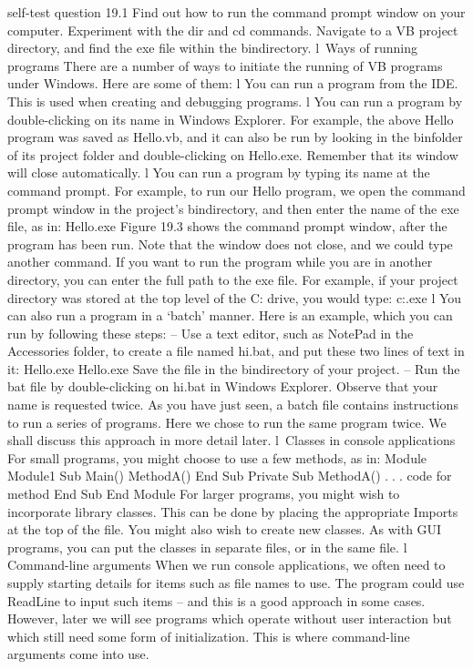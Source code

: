 self-test question
19.1	Find out how to run the command prompt window on your computer. Experiment with the dir and cd commands. Navigate to a VB project directory, and ﬁnd the exe ﬁle within the bin\Debug directory.
l Ways of running programs
There are a number of ways to initiate the running of VB programs under Windows. Here are some of them:
l	You can run a program from the IDE. This is used when creating and debugging programs.
l	You can run a program by double-clicking on its name in Windows Explorer. For example, the above Hello program was saved as Hello.vb, and it can also be run by looking in the bin\Debug folder of its project folder and double-clicking on Hello.exe. Remember that its window will close automatically.
l	You can run a program by typing its name at the command prompt. For example, to run our Hello program, we open the command prompt window in the project’s bin\Debug directory, and then enter the name of the exe ﬁle, as in:
Hello.exe
	Figure 19.3 shows the command prompt window, after the program has been run. Note that the window does not close, and we could type another command.
If you want to run the program while you are in another directory, you can enter the full path to the exe ﬁle. For example, if your project directory was stored at the top level of the C: drive, you would type:
c:\Hello\bin\Debug\Hello.exe
l	You can also run a program in a ‘batch’ manner. Here is an example, which you can run by following these steps:
–	Use a text editor, such as NotePad in the Accessories folder, to create a ﬁle named hi.bat, and put these two lines of text in it:
Hello.exe
Hello.exe
	Save the ﬁle in the bin\Debug directory of your project.
–	Run the bat ﬁle by double-clicking on hi.bat in Windows Explorer. Observe that your name is requested twice.
	As you have just seen, a batch ﬁle contains instructions to run a series of programs. Here we chose to run the same program twice. We shall discuss this approach in more detail later.
l Classes in console applications
For small programs, you might choose to use a few methods, as in:
Module Module1
	Sub Main()
		MethodA()
	End Sub
	Private Sub MethodA()
		. . . code for method
	End Sub
End Module
For larger programs, you might wish to incorporate library classes. This can be done by placing the appropriate Imports at the top of the ﬁle.
You might also wish to create new classes. As with GUI programs, you can put the classes in separate ﬁles, or in the same ﬁle.
l Command-line arguments
When we run console applications, we often need to supply starting details for items such as ﬁle names to use. The program could use ReadLine to input such items – and this is a good approach in some cases. However, later we will see programs which operate without user interaction but which still need some form of initialization. This is where command-line arguments come into use.
